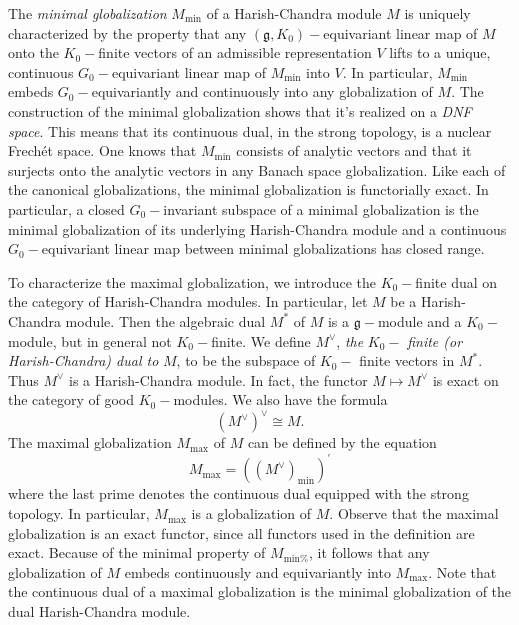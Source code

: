 The \emph{minimal globalization }$M_{\text{min}}$ of a
Harish-Chandra module $M$ is uniquely characterized by the property that any
$(\mathfrak{g},K_{0})-$equivariant linear map of $M$ onto the $K_{0}-$finite
vectors of an admissible representation $V$ lifts to a unique, continuous $%
G_{0}-$equivariant linear map of $M_{\text{min}}$ into $V$. In particular, $%
M_{\text{min}}$ embeds $G_{0}-$equivariantly and continuously into any
globalization of $M$. The construction of the minimal globalization shows
that it's realized on a \emph{DNF space}. This means that its continuous
dual, in the strong topology, is a nuclear Frech\'{e}t space. One knows that
$M_{\text{min}}$ consists of analytic vectors and that it surjects onto the
analytic vectors in any Banach space globalization. Like each of the canonical
globalizations, the minimal globalization is functorially exact. In
particular, a closed $G_{0}-$invariant subspace of a minimal globalization
is the minimal globalization of its underlying Harish-Chandra module and a
continuous $G_{0}-$equivariant linear map between minimal globalizations has
closed range.

To characterize the maximal globalization, we introduce the $%
K_{0}- $finite dual on the category of Harish-Chandra modules. In
particular, let $M $ be a Harish-Chandra module. Then the algebraic dual $%
M^{\ast }$ of $M$ is a $\mathfrak{g}-$module and a $K_{0}-$module, but in
general not $K_{0}-$finite. We define $M^{\vee }$, \emph{the} $K_{0}-$\emph{%
finite (or Harish-Chandra) dual to} $M$, to be the subspace of $K_{0}-$%
finite vectors in $M^{\ast }$. Thus $M^{\vee }$ is a Harish-Chandra module.
In fact, the functor $M\mapsto M^{\vee }$ is exact on the category of good $%
K_{0}-$modules. We also have the formula
\begin{equation*}
\left( M^{\vee }\right) ^{\vee }\cong M\text{.}
\end{equation*}%
The maximal globalization $M_{\text{max}}$ of $M$ can be defined by the
equation%
\begin{equation*}
M_{\text{max}}=\left( \left( M^{\vee }\right) _{\text{min}}\right) ^{\prime }
\end{equation*}%
where the last prime denotes the continuous dual equipped with the strong
topology. In particular, $M_{\text{max}}$ is a globalization of $M$. Observe
that the maximal globalization is an exact functor, since all functors used
in the definition are exact. Because of the minimal property of $M_{\text{min%
}}$, it follows that any globalization of $M$ embeds continuously and
equivariantly into $M_{\text{max}}$. Note that the continuous dual of a
maximal globalization is the minimal globalization of the dual
Harish-Chandra module.


